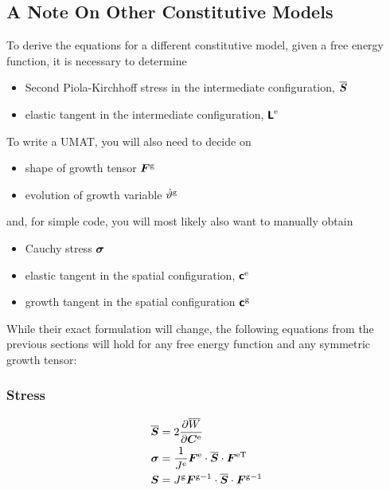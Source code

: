 \documentclass[10pt,letterpaper,oneside]{report}
\newcommand{\ten}[1]{\mbox{\boldmath $#1$}{}}
\newcommand{\tenf}[1]{\mbox{{\sffamily{\bfseries {#1}}}}}
\newcommand{\scas}[1]{\mbox{{\scriptsize{${\rm{#1}}$}}}{}}
\begin{document}
\begin{itemize}
\section{A Note On Other Constitutive Models}
To derive the equations for a different constitutive model, given a free energy function, it is necessary to determine
\begin{itemize}
\item Second Piola-Kirchhoff stress in the intermediate configuration, $\overline{ \ten{S} }$
\item elastic tangent in the intermediate configuration, $\tenf{L}^{\scas{e}}$
\end{itemize}
To write a UMAT, you will also need to decide on
\begin{itemize}
\item shape of growth tensor $\ten{F}^{\scas{g}}$
\item evolution of growth variable $\dot{\vartheta}^{\scas{g}}$
\end{itemize}
and, for simple code, you will most likely also want to manually obtain
\begin{itemize}
\item Cauchy stress $\ten{\sigma}$
\item elastic tangent in the spatial configuration, $\tenf{c}^{\scas{e}}$
\item growth tangent in the spatial configuration $\tenf{c}^{\scas{g}}$
\end{itemize}
While their exact formulation will change, the following equations from the previous sections will hold for any free energy function and any symmetric growth tensor:
\subsubsection{Stress}
\begin{align}
\overline{\ten{S}} ={}& 2 \frac{\partial \overline{W}}{\partial \ten{C}^{\scas{e}}}  
\\
\ten{\sigma} ={}& \frac{1}{J^{\scas{e}}} \ten{F}^{\scas{e}} \cdot \overline{\ten{S}} \cdot \ten{F}^{\scas{eT}}  
\\
\ten{S} ={}& J^{\scas{g}} \ten{F}^{\scas{g}-1} \cdot \overline{\ten{S}} \cdot \ten{F}^{\scas{g}-1}
\end{align}


\end{itemize}
\end{document}
